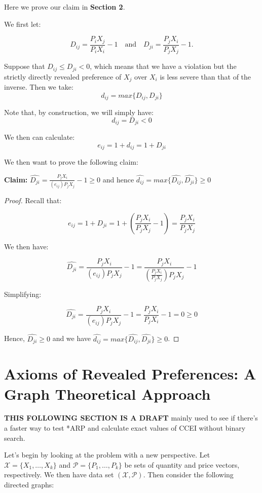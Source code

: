 \documentclass{article} %
\begin{document}
Here we prove our claim in \textbf{Section 2}.


We first let:


$$D_{ij}=\frac{P_iX_j}{P_iX_i}-1 \quad \text{and} \quad D_{ji}=\frac{P_jX_i}{P_jX_j}-1.$$



Suppose that $D_{ij}\leq D_{ji}<0$, which means that we have a violation but the strictly directly revealed preference of $X_j$ over $X_i$ is less severe than that of the inverse. Then we take:
$$d_{ij}=max\{D_{ij},D_{ji}\}$$

Note that, by construction, we will simply have:
$$d_{ij}=D_{ji}<0$$

We then can calculate:
$$e_{ij}=1+d_{ij}=1+D_{ji}$$

We then want to prove the following claim:


\textbf{Claim:} $\hat{D_{ji}}=\frac{P_jX_i}{(e_{ij})P_jX_j}-1\geq0$ and hence $\hat{d_{ij}}=max\{\hat{D_{ij}},\hat{D_{ji}}\}\geq0$


\begin{proof}
Recall that:

$$e_{ij}=1+D_{ji}=1+ \left (\frac{P_jX_i}{P_jX_j}-1 \right )=\frac{P_jX_i}{P_jX_j}$$

We then have:

$$\hat{D_{ji}}=\frac{P_jX_i}{(e_{ij})P_jX_j}-1=\frac{P_jX_i}{(\frac{P_jX_i}{P_jX_j})P_jX_j}-1$$

Simplifying:

$$\hat{D_{ji}}=\frac{P_jX_i}{(e_{ij})P_jX_j}-1=\frac{P_jX_i}{P_jX_i}-1=0\geq0$$

Hence, $\hat{D_{ji}}\geq0$ and we have $\hat{d_{ij}}=max\{\hat{D_{ij}},\hat{D_{ji}}\}\geq0$.

\end{proof}

\newpage

\section{Axioms of Revealed Preferences: A Graph Theoretical Approach}

\textbf{THIS FOLLOWING SECTION IS A DRAFT} mainly used to see if there's a faster way to test *ARP and calculate exact values of CCEI without binary search.


Let's begin by looking at the problem with a new perspective. Let $\mathcal{X}=\{X_1,\ldots,X_k\}$ and $\mathcal{P}=\{P_1,\ldots,P_k\}$ be sets of quantity and price vectors, respectively. We then have data set $(\mathcal{X},\mathcal{P})$. Then consider the following directed graphs:
\end{document}
